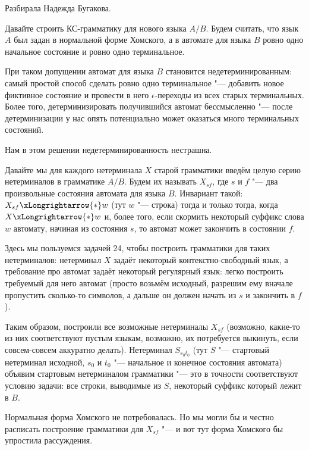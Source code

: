 	Разбирала Надежда Бугакова.

	Давайте строить КС-грамматику для нового языка $A/B$.
	Будем считать, что язык $A$ был задан в нормальной форме Хомского,
	а в автомате для языка $B$ ровно одно начальное состояние и ровно одно терминальное.
	\begin{Rem}
		При таком допущении автомат для языка $B$ становится недетерминированным: самый простой способ
		сделать ровно одно терминальное "--- добавить новое фиктивное состояние и провести в него $\epsilon$-переходы из всех старых терминальных.
		Более того, детерминизировать получившийся автомат бессмысленно "--- после детерминизации у нас опять потенциально может оказаться много терминальных состояний.

		Нам в этом решении недетерминированность нестрашна.
	\end{Rem}
	Давайте мы для каждого нетерминала $X$ старой грамматики введём целую серию нетерминалов в грамматике $A/B$.
	Будем их называть $X_{sf}$, где $s$ и $f$ "--- два произвольные состояния автомата для языка $B$.
	Инвариант такой: $X_{sf}\xLongrightarrow{*} w$ (тут $w$ "--- строка) тогда и только тогда,
	когда $X \xLongrightarrow{*} w$ и, более того, если скормить некоторый суффикс слова $w$ автомату,
	начиная из состояния $s$, то автомат может закончить в состоянии $f$.

	Здесь мы пользуемся задачей 24, чтобы построить грамматики для таких нетерминалов: нетерминал $X$ задаёт некоторый
	контекстно-свободный язык, а требование про автомат задаёт некоторый регулярный язык: легко построить
	требуемый для него автомат (просто возьмём исходный, разрешим ему вначале пропустить сколько-то символов,
	а дальше он должен начать из $s$ и закончить в $f$).

	Таким образом, построили все возможные нетерминалы $X_{sf}$ (возможно, какие-то из них соответствуют пустым языкам,
	возможно, их потребуется выкинуть, если совсем-совсем аккуратно делать).
	Нетерминал $S_{s_0t_0}$ (тут $S$ "--- стартовый нетерминал исходной, $s_0$ и $t_0$ "--- начальное и конечное состояния автомата)
	объявим стартовым нетерминалом грамматики "--- это в точности соответствуют условию задачи: все строки, выводимые из $S$,
	некоторый суффикс который лежит в $B$.

	\begin{Rem}
		Нормальная форма Хомского не потребовалась.
		Но мы могли бы и честно расписать построение грамматики для $X_{sf}$ "--- и вот тут форма Хомского бы упростила рассуждения.
	\end{Rem}

